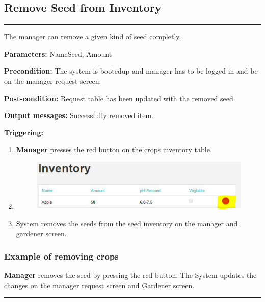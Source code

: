 \break

\subsection{Remove Seed from Inventory}

\hrule
\hfill
\vspace{0.5cm}

\label{operation:RemoveSeed}

The manager can remove a given kind of seed completly.
\begin{description}

\item \textbf{Parameters:} NameSeed, Amount
\item \textbf{Precondition:} The system is bootedup and manager has to be
logged in and be on the manager request screen.
\item \textbf{Post-condition:} Request table has been updated with the removed
seed.
\item \textbf{Output messages:} Successfully removed item.
\item \textbf{Triggering:}
\begin{enumerate}
\item \textbf{Manager} presses the red button on the crops inventory table.
\item \begin{figure}[H]
\includegraphics[width=1\textwidth]{images/RemoveSeedFromInventory.eps}
\end{figure}
\item System removes the seeds from the seed inventory on the manager and
gardener screen.
\end{enumerate}
\end{description}

\subsubsection{Example of removing crops}
\textbf{Manager} removes the seed by pressing the red button. The System
updates the changes on the manager request screen and Gardener screen.
\hfill
\vspace{0.5cm}
\hrule


